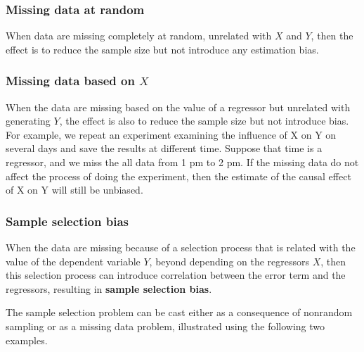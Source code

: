 \documentclass[a4paper,11pt]{article}
\begin{document}
\subsubsection*{Missing data at random}
\label{sec:orgd0b776b}

When data are missing completely at random, unrelated with \(X\) and
\(Y\), then the effect is to reduce the sample size but not introduce
any estimation bias. 

\subsubsection*{Missing data based on \(X\)}
\label{sec:org3cb4231}

When the data are missing based on the value of a regressor but
unrelated with generating \(Y\), the effect is also to reduce the sample
size but not introduce bias. For example, we repeat an experiment
examining the influence of X on Y on several days and save the results
at different time. Suppose that time is a regressor, and we miss the
all data from 1 pm to 2 pm. If the missing data do not affect the
process of doing the experiment, then the estimate of the causal
effect of X on Y will still be unbiased.

\subsubsection*{Sample selection bias}
\label{sec:org0c259b9}

When the data are missing because of a selection process that is
related with the value of the dependent variable \(Y\), beyond depending
on the regressors \(X\), then this selection process can introduce
correlation between the error term and the regressors, resulting in
\textbf{sample selection bias}.

The sample selection problem can be cast either as a consequence of
nonrandom sampling or as a missing data problem, illustrated using the
following two examples. 
\end{document}
